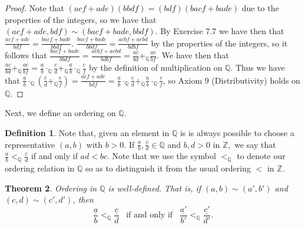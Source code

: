 \documentclass[12pt]{article}
\newcommand{\bbQ}{\mathbb{Q}}
\newcommand{\bbZ}{\mathbb{Z}}
\newcommand{\fr}[2]{\frac{\underline{#1}}{#2}}
\renewcommand{\_}[1]{\underline{ #1 }}
\newtheorem{theorem}{Theorem}[section]
\theoremstyle{definition}
\newtheorem{definition}[theorem]{Definition}
\numberwithin{equation}{subsection}
\begin{document}
\begin{proof}
Note that $(acf + ade)(bbdf) = (bdf)(bacf + bade)$ due to the properties of the integers, so we have that $(acf + ade, bdf) \sim (bacf + bade,bbdf)$. By Exercise 7.7 we have then that $\fr{acf + ade}{bdf} = \fr{bacf +bade}{bbdf}$. $\fr{bacf + bade}{bbdf} = \fr{acbf + aebd}{bdbf}$ by the properties of the integers, so it follows that $\fr{bacf+bade}{bbdf} = \fr{acbf+aebd}{bdbf} = \fr{ac}{bd} +_{\bbQ} \fr{ae}{bf}$. We have then that $\fr{ac}{bd} +_{\bbQ} \fr{ae}{bf} = \fr{a}{b} \cdot_{\bbQ} \fr{c}{d} +_{\bbQ} \fr{a}{b} \cdot_{\bbQ} \fr{e}{f}$ by the definition of multiplication on $\bbQ$. Thus we have that $\fr{a}{b} \cdot_{\bbQ} (\fr{c}{d} +_{\bbQ} \fr{e}{f}) = \fr{acf + ade}{bdf} = \fr{a}{b} \cdot_{\bbQ} \fr{c}{d} +_{\bbQ} \fr{a}{b} \cdot_{\bbQ} \fr{e}{f}$, so Axiom 9 (Distributivity) holds on $\bbQ$.
\end{proof}

Next, we define an ordering on $\bbQ$.

\begin{definition}
Note that, given an element in $\bbQ$ is is always possible to choose a representative $(a,b)$ with $b>0.$
If $\displaystyle \fr{a}{b}, \fr{c}{d}\in \bbQ$ and $b,d>0$ in $\bbZ,$ we say that $\displaystyle \fr{a}{b}<_\bbQ \fr{c}{d}$ if and only if $a d<b c$.
Note that we use the symbol $<_\bbQ$ to denote our ordering relation in $\bbQ$ so as to 
distinguish it from the usual ordering $<$ in $\bbZ$.
\end{definition}

\begin{theorem}
Ordering in $\bbQ$ is well-defined.  That is, if $(a,b)\sim (a', b')$ and $(c,d)\sim (c',d')$, then
$$
\fr{a}{b}<_\bbQ \fr{c}{d}\hspace{10pt}\mbox{if and only if}\hspace{10pt}\fr{a'}{b'}<_\bbQ \fr{c'}{d'}.
$$
\end{theorem}
\end{document}
